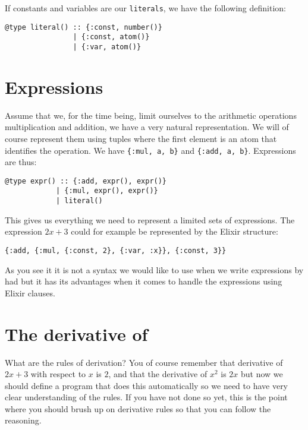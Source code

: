 \documentclass[a4paper,11pt]{article}
\begin{document}
If constants and variables are our {\tt literals}, we have the
following definition:

\begin{verbatim}
@type literal() :: {:const, number()} 
                | {:const, atom()} 
                | {:var, atom()}
\end{verbatim}



\section{Expressions}

Assume that we, for the time being, limit ourselves to the arithmetic
operations multiplication and addition, we have a very natural
representation. We will of course represent them using tuples where
the first element is an atom that identifies the operation. We have
{\tt\{:mul, a, b\}} and {\tt \{:add, a, b\}}. Expressions are thus:

\begin{verbatim}
@type expr() :: {:add, expr(), expr()} 
            | {:mul, expr(), expr()} 
            | literal()
\end{verbatim}

This gives us everything we need to represent a limited sets of
expressions. The expression $2x + 3$ could for example be represented
by the Elixir structure:

\begin{verbatim}
{:add, {:mul, {:const, 2}, {:var, :x}}, {:const, 3}}
\end{verbatim}

\noindent As you see it it is not a syntax we would like to use when we write
expressions by had but it has its advantages when it comes to handle
the expressions using Elixir clauses. 



\section{The derivative of}

What are the rules of derivation? You of course remember that derivative
of $2x + 3$ with respect to $x$ is $2$, and that the derivative of
$x^2$ is $2x$ but now we should define a program that does this
automatically so we need to have very clear understanding of the
rules. If you have not done so yet, this is the point where you should
brush up on derivative rules so that you can follow the reasoning.
\end{document}

